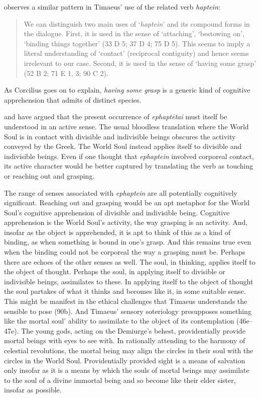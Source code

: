 \citet[]{Corcilius:2018bd} observes a similar pattern in Timaeus' use of the related verb \emph{haptein}:
\begin{quote}
	We can distinguish two main uses of `\emph{haptein}' and its compound forms in the dialogue. First, it is used in the sense of `attaching', `bestowing on', `binding things together' (33 D 5; 37 D 4; 75 D 5). This seems to imply a literal understanding of `contact' (reciprocal contiguity) and hence seems irrelevant to our case. Second, it is used in the sense of `having some grasp' (52 B 2; 71 E 1, 3; 90 C 2). \citep[85]{Corcilius:2018bd}
\end{quote}
As Corcilius goes on to explain, \emph{having some grasp} is a generic kind of cognitive apprehension that admits of distinct species.

\citealt{Corcilius:2018bd} and \citet[]{Betegh:2019fq} have argued that the present occurrence of \emph{ephaptētai} must itself be understood in an active sense. The usual bloodless translation where the World Soul is in contact with divisible and indivisible beings obscures the activity conveyed by the Greek. The World Soul instead applies itself to divisible and indivisible beings. Even if one thought that \emph{ephaptein} involved corporeal contact, its active character would be better captured by translating the verb as touching or reaching out and grasping.

The range of senses associated with \emph{ephaptein} are all potentially cognitively significant. Reaching out and grasping would be an apt metaphor for the World Soul's cognitive apprehension of divisible and indivisible being. Cognitive apprehension is the World Soul's activity, the way grasping is an activity. And, insofar as the object is apprehended, it is apt to think of this as a kind of binding, as when something is bound in one's grasp. And this remains true even when the binding could not be corporeal the way a grasping must be. Perhaps there are echoes of the other senses as well. The soul, in thinking, applies itself to the object of thought. Perhaps the soul, in applying itself to divisible or indivisible beings, assimilates to these. In applying itself to the object of thought the soul partakes of what it thinks and becomes like it, in some suitable sense. This might be manifest in the ethical challenges that Timaeus understands the sensible to pose (90b). And Timaeus' sensory soteriology presupposes something like the mortal soul' ability to assimilate to the object of its contemplation (46e--47e). The young gods, acting on the Demiurge's behest, providentially provide mortal beings with eyes to see with. In rationally attending to the harmony of celestial revolutions, the mortal being may align the circles in their soul with the circles in the World Soul. Providentially provided sight is a means of salvation only insofar as it is a means by which the souls of mortal beings may assimilate to the soul of a divine immortal being and so become like their elder sister, insofar as possible.

